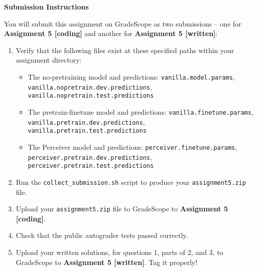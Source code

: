 \documentclass[answers]{exam}
\begin{document}
\Large{\textbf{Submission Instructions}}

\normalsize
You will submit this assignment on GradeScope as two submissions -- one for \textbf{Assignment 5 [coding]} and another for \textbf{Assignment 5 [written]}:
\begin{enumerate}
    \item Verify that the following files exist at these specified paths within your assignment directory:
        \begin{itemize}
            \item The no-pretraining model and predictions: \texttt{vanilla.model.params}, \texttt{vanilla.nopretrain.dev.predictions},\\\texttt{vanilla.nopretrain.test.predictions}
            \item The pretrain-finetune model and predictions: \texttt{vanilla.finetune.params}, \texttt{vanilla.pretrain.dev.predictions}, \\ \texttt{vanilla.pretrain.test.predictions}
            \item The Perceiver model and predictions: \texttt{perceiver.finetune.params}, \texttt{perceiver.pretrain.dev.predictions}, \\ \texttt{perceiver.pretrain.test.predictions}
        \end{itemize}

    \item Run the \texttt{collect\_submission.sh} script to produce your \texttt{assignment5.zip} file.
    \item Upload your \texttt{assignment5.zip} file to GradeScope to \textbf{Assignment 5 [coding]}.
    \item Check that the public autograder tests passed correctly.
    \item Upload your written solutions, for questions 1, parts of 2, and 3, to GradeScope to \textbf{Assignment 5 [written]}. Tag it properly!
\end{enumerate}



\end{document}
